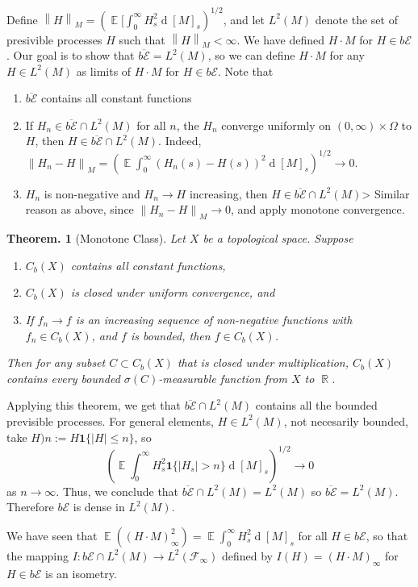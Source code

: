 \documentclass[11pt, a4paper]{memoir}
\DeclareMathOperator{\R}{{\mathbb{R}}}
\newcommand{\norm}[1]{\ensuremath{\left\lVert#1\right\rVert}}
\theoremstyle{change}
\newtheorem{theorem}{Theorem.}[section]
\theoremstyle{plain}
\theoremstyle{nonumberplain}
\DeclareMathOperator{\E}{{\mathbb{E}}}
\renewcommand{\d}[1]{\ensuremath{\operatorname{d}\!{#1}}}
\newcommand{\idc}{\mathbf{1}}
\numberwithin{equation}{section}
\begin{document}
Define $\norm{H}_M=(\E[\int_0^\infty H_s^2\d{[M]_s})^{1/2}$, and let $L^2(M)$ denote the set of presivible processes $H$ such that $\norm{H}_M<\infty$.
We have defined $H\cdot M$ for $H\in b\mathcal{E}$.
Our goal is to show that $\overline{b\mathcal{E}}=L^2(M)$, so we can define $H\cdot M$ for any $H\in L^2(M)$ as limits of $H\cdot M$ for $H\in b\mathcal{E}$.
Note that
\begin{enumerate}[nl]
    \item $\overline{b\mathcal{E}}$ contains all constant functions
    \item If $H_n\in\overline{b\mathcal{E}}\cap L^2(M)$ for all $n$, the $H_n$ converge uniformly on $(0,\infty)\times\Omega$ to $H$, then $H\in\overline{b\mathcal{E}}\cap L^2(M)$.
        Indeed, $\norm{H_n-H}_M=(\E\int_0^\infty(H_n(s)-H(s))^2\d{[M]_s})^{1/2}\to 0$.
    \item $H_n$ is non-negative and $H_n\to H$ increasing, then $H\in\overline{b\mathcal{E}}\cap L^2(M)$>
        Similar reason as above, since $\norm{H_n-H}_M\to 0$, and apply monotone convergence.
\end{enumerate}
\begin{theorem}[Monotone Class]
    Let $X$ be a topological space.
    Suppose
    \begin{enumerate}[nl,r]
        \item $C_b(X)$ contains all constant functions,
        \item $C_b(X)$ is closed under uniform convergence, and
        \item If $f_n\to f$ is an increasing sequence of non-negative functions with $f_n\in C_b(X)$, and $f$ is bounded, then $f\in C_b(X)$.
    \end{enumerate}
    Then for any subset $C\subset C_b(X)$ that is closed under multiplication, $C_b(X)$ contains every bounded $\sigma(C)$-measurable function from $X$ to $\R$.
\end{theorem}
Applying this theorem, we get that $\overline{b\mathcal{E}}\cap L^2(M)$ contains all the bounded previsible processes.
For general elements, $H\in L^2(M)$, not necesarily bounded, take $H)n:=H\idc{\{|H|\leq n\}}$, so
\begin{equation*}
    (\E\int_0^\infty H_s^2\idc{\{|H_s|>n\}}\d{[M]_s})^{1/2}\to 0
\end{equation*}
as $n\to\infty$.
Thus, we conclude that $\overline{b\mathcal{E}}\cap L^2(M)=L^2(M)$ so $\overline{b\mathcal{E}}=L^2(M)$.
Therefore $b\mathcal{E}$ is dense in $L^2(M)$.

We have seen that $\E((H\cdot M)_\infty^2)=\E\int_0^\infty H_s^2\d{[M]_s}$ for all $H\in b\mathcal{E}$, so that the mapping $I:b\mathcal{E}\cap L^2(M)\to L^2(\mathcal{F}_\infty)$ defined by $I(H)=(H\cdot M)_\infty$ for $H\in b\mathcal{E}$ is an isometry.
\end{document}

